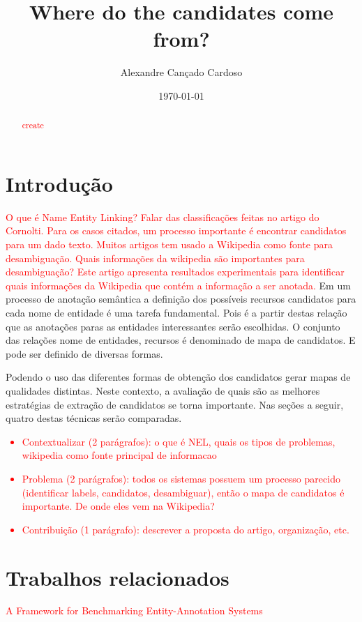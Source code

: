 \documentclass[10pt,a4paper]{llncs}
\title{Where do the candidates come from?}
\author{Alexandre Cançado Cardoso}
\institute{UFJF}
\date{\today}
\begin{document}
\maketitle

 \begin{abstract}
    \textcolor{red}{create}
 \end{abstract}

\section{Introdução} \label{introducao}

\textcolor{red}{O que é Name Entity Linking? Falar das classificações feitas no artigo do Cornolti. Para os casos citados, um processo importante é encontrar candidatos para um dado texto. Muitos artigos tem usado a Wikipedia como fonte para desambiguação. Quais informações da wikipedia são importantes para desambiguação? Este artigo apresenta resultados experimentais para identificar quais informações da Wikipedia que contém a informação a ser anotada.}
 Em um processo de anotação semântica a definição dos possíveis recursos candidatos para cada nome de entidade é uma tarefa fundamental. Pois é a partir destas relação que as anotações paras as entidades interessantes serão escolhidas. O conjunto das relações nome de entidades, recursos é denominado de mapa de candidatos. E pode ser definido de diversas formas.

Podendo o uso das diferentes formas de obtenção dos candidatos gerar mapas de qualidades distintas. Neste contexto, a avaliação de quais são as melhores estratégias de extração de candidatos se torna importante. Nas seções a seguir, quatro destas técnicas serão comparadas.


\textcolor{red}{
  \begin{itemize}
    \item Contextualizar (2 parágrafos): o que é NEL, quais os tipos de problemas, wikipedia como fonte principal de informacao
    \item Problema (2 parágrafos): todos os sistemas possuem um processo parecido (identificar labels, candidatos, desambiguar), então o mapa de candidatos é importante. De onde eles vem na Wikipedia?
   \item Contribuição (1 parágrafo): descrever a proposta do artigo, organização, etc.
  \end{itemize}
}



\section{Trabalhos relacionados}\label{related}
\textcolor{red}{A Framework for Benchmarking Entity-Annotation Systems}
\end{document}

